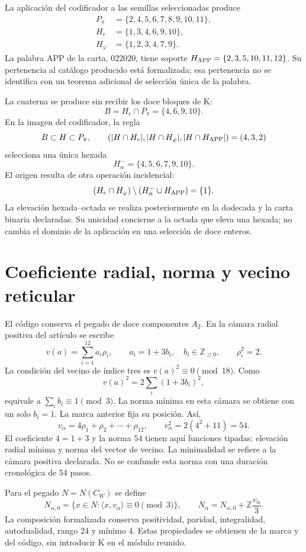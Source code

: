 \documentclass[11pt,a4paper]{article}
\newcommand{\Z}{\mathbb Z}
\begin{document}
La aplicación del codificador a las semillas seleccionadas produce
\begin{align*}
 P_\pi&=\{2,4,5,6,7,8,9,10,11\},\\
 H_e&=\{1,3,4,6,9,10\},\\
 H_\varphi&=\{1,2,3,4,7,9\}.
\end{align*}
La palabra APP de la carta, $022020$, tiene soporte
$H_{\rm APP}=\{2,3,5,10,11,12\}$. Su pertenencia al catálogo producido está
formalizada; esa pertenencia no se identifica con un teorema adicional de
selección única de la palabra.

La cuaterna se produce sin recibir los doce bloques de K:
\[
 B=H_e\cap P_\pi=\{4,6,9,10\}.
\]
En la imagen del codificador, la regla
\[
 B\subset H\subset P_\pi,\qquad
 (|H\cap H_e|,|H\cap H_\varphi|,|H\cap H_{\rm APP}|)=(4,3,2)
\]
selecciona una única hexada
\[
 H^-_\alpha=\{4,5,6,7,9,10\}.
\]
El origen resulta de otra operación incidencial:
\[
 (H_e\cap H_\varphi)\setminus(H^-_\alpha\cup H_{\rm APP})=\{1\}.
\]
La elevación hexada--octada se realiza posteriormente en la dodecada y la
carta binaria declaradas. Su unicidad concierne a la octada que eleva una
hexada; no cambia el dominio de la aplicación en una selección de doce
enteros.

\section{Coeficiente radial, norma y vecino reticular}

El código conserva el pegado de doce componentes $A_2$. En la cámara radial
positiva del artículo se escribe
\[
 v(a)=\sum_{i=1}^{12}a_i\rho_i,
 \qquad a_i=1+3b_i,\quad b_i\in\Z_{\geq0},
 \qquad \rho_i^2=2.
\]
La condición del vecino de índice tres es $v(a)^2\equiv0\pmod{18}$.
Como
\[
 v(a)^2=2\sum_i(1+3b_i)^2,
\]
equivale a $\sum_i b_i\equiv1\pmod3$. La norma mínima en esta cámara
se obtiene con un solo $b_i=1$. La marca anterior fija su posición. Así,
\[
 v_\alpha=4\rho_1+\rho_2+\cdots+\rho_{12},
 \qquad v_\alpha^2=2(4^2+11)=54.
\]
El coeficiente $4=1+3$ y la norma $54$ tienen aquí funciones tipadas:
elevación radial mínima y norma del vector de vecino. La minimalidad se
refiere a la cámara positiva declarada. No se confunde esta norma con una
duración cronológica de 54 pasos.

Para el pegado $N=N(C_W)$ se define
\[
 N_{\alpha,0}=\{x\in N:\langle x,v_\alpha\rangle\equiv0\pmod3\},
 \qquad N_\alpha=N_{\alpha,0}+\Z\frac{v_\alpha}{3}.
\]
La composición formalizada conserva positividad, paridad, integralidad,
autodualidad, rango 24 y mínimo 4. Estas propiedades se obtienen de la marca y
del código, sin introducir K en el módulo reunido.
\end{document}
